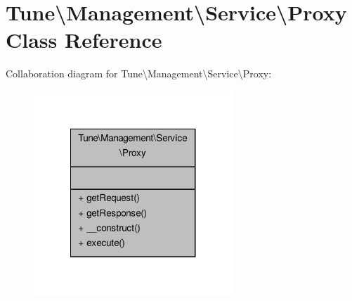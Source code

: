 \hypertarget{classTune_1_1Management_1_1Service_1_1Proxy}{\section{Tune\textbackslash{}Management\textbackslash{}Service\textbackslash{}Proxy Class Reference}
\label{classTune_1_1Management_1_1Service_1_1Proxy}
}


Collaboration diagram for Tune\textbackslash{}Management\textbackslash{}Service\textbackslash{}Proxy\-:
\nopagebreak
\begin{figure}[H]
\begin{center}
\leavevmode
\includegraphics[width=212pt]{classTune_1_1Management_1_1Service_1_1Proxy__coll__graph}
\end{center}
\end{figure}
